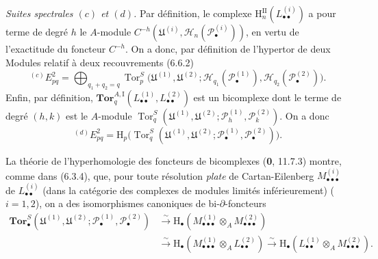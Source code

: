 \begin{env}[6.6.5]
\emph{Suites spectrales $(c)$ et $(d)$.} Par définition, le complexe
$\mathrm H_n^{\mathrm{II}}(L_{\bullet\bullet}^{(i)})$ a pour terme de degré
$h$ le $A$-module
$C^{-h}(\mathfrak U^{(i)},\mathscr H_n(\mathscr P_\bullet^{(i)}))$, en vertu
de l'exactitude du foncteur $C^{-h}$. On a donc, par définition de l'hypertor
de deux Modules relatif à deux recouvrements (6.6.2)
\[
  {}^{(c)}E_{pq}^2
  =\bigoplus_{q_1+q_2=q}
   \operatorname{Tor}_p^S
   \bigl(\mathfrak U^{(1)},\mathfrak U^{(2)};
         \mathscr H_{q_1}(\mathscr P_\bullet^{(1)}),
         \mathscr H_{q_2}(\mathscr P_\bullet^{(2)})\bigr).
\]
Enfin, par définition,
$\mathbf{Tor}_q^{A,\mathrm I}
(L_{\bullet\bullet}^{(1)},L_{\bullet\bullet}^{(2)})$ est un bicomplexe dont
le terme de degré $(h,k)$ est le $A$-module
$\operatorname{Tor}_q^S
(\mathfrak U^{(1)},\mathfrak U^{(2)};
 \mathscr P_h^{(1)},\mathscr P_k^{(2)})$. On a donc
\[
  {}^{(d)}E_{pq}^2
  =\mathrm H_p\bigl(
    \operatorname{Tor}_q^S
    (\mathfrak U^{(1)},\mathfrak U^{(2)};
     \mathscr P_\bullet^{(1)},\mathscr P_\bullet^{(2)})\bigr).
\]
\end{env}

\begin{env}[6.6.6]
La théorie de l'hyperhomologie des foncteurs de bicomplexes
(\textbf{0}, 11.7.3) montre, comme dans (6.3.4), que, pour toute
résolution \emph{plate} de Cartan-Eilenberg $M_{\bullet\bullet\bullet}^{(i)}$ de
$L_{\bullet\bullet}^{(i)}$ (dans la catégorie des complexes de modules
limités inférieurement) ($i=1,2$), on a des isomorphismes canoniques de
bi-$\partial$-foncteurs
\[
\begin{aligned}
  \mathbf{Tor}_\bullet^S
  (\mathfrak U^{(1)},\mathfrak U^{(2)};
   \mathscr P_\bullet^{(1)},\mathscr P_\bullet^{(2)})
  &\xrightarrow{\sim}
   \mathrm H_\bullet
   (M_{\bullet\bullet\bullet}^{(1)}\otimes_A M_{\bullet\bullet\bullet}^{(2)})\\
  &\xrightarrow{\sim}
   \mathrm H_\bullet
   (M_{\bullet\bullet\bullet}^{(1)}\otimes_A L_{\bullet\bullet}^{(2)})
   \xrightarrow{\sim}
   \mathrm H_\bullet
   (L_{\bullet\bullet}^{(1)}\otimes_A M_{\bullet\bullet\bullet}^{(2)}).
\end{aligned}
\tag{6.6.6.1}\label{III.6.6.6.1.fr}
\]
\end{env}

